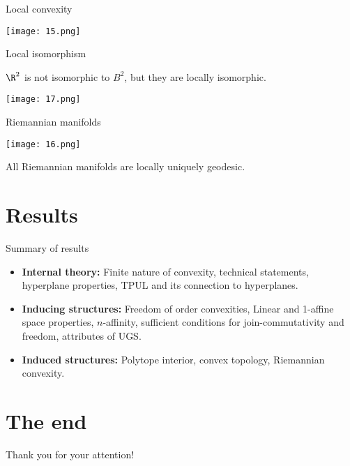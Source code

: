 \documentclass[12pt]{beamer}
\begin{document}
\newpage

\begin{frame}{Local convexity}
    
    \centering

    \texttt{[image: 15.png]}
\end{frame}

\newpage

\begin{frame}{Local isomorphism}
    \begin{lemma}
        \(\R^2\) is not isomorphic to \(B^2\), but they are locally isomorphic.
    \end{lemma}

    \centering

    \texttt{[image: 17.png]}
\end{frame}

\newpage

\begin{frame}{Riemannian manifolds}
    \centering

    \texttt{[image: 16.png]}

    \begin{lemma}
        All Riemannian manifolds are locally uniquely geodesic.
    \end{lemma}
\end{frame}

\newpage

\section*{Results}

\begin{frame}{Summary of results}
\footnotesize
\begin{itemize}
    \item \textbf{Internal theory:} Finite nature of convexity, technical statements, hyperplane properties, TPUL and its connection to hyperplanes.

    \item \textbf{Inducing structures:} Freedom of order convexities, Linear and 1-affine space properties, \(n\)-affinity, sufficient conditions for join-commutativity and freedom, attributes of UGS.
    
    \item \textbf{Induced structures:} Polytope interior, convex topology, Riemannian convexity.
\end{itemize}
\end{frame}

\section*{The end}

\begin{frame}
    \centering

    \vspace{12mm}

    {\LARGE Thank you for your attention!}
\end{frame}
\end{document}
